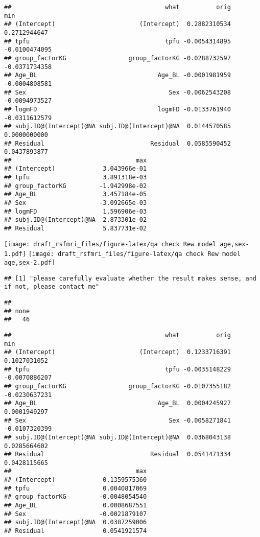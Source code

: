 \documentclass[
]{article}
\begin{document}
\begin{verbatim}
##                                          what          orig           min
## (Intercept)                       (Intercept)  0.2882310534  0.2712944647
## tpfu                                     tpfu -0.0054314895 -0.0100474095
## group_factorKG                 group_factorKG -0.0288732597 -0.0371734358
## Age_BL                                 Age_BL -0.0001981959 -0.0004808581
## Sex                                       Sex -0.0062543208 -0.0094973527
## logmFD                                 logmFD -0.0133761940 -0.0311612579
## subj.ID@(Intercept)@NA subj.ID@(Intercept)@NA  0.0144570585  0.0000000000
## Residual                             Residual  0.0585590452  0.0437893877
##                                  max
## (Intercept)             3.043966e-01
## tpfu                    3.891318e-03
## group_factorKG         -1.942998e-02
## Age_BL                  3.457184e-05
## Sex                    -3.092665e-03
## logmFD                  1.596906e-03
## subj.ID@(Intercept)@NA  2.873301e-02
## Residual                5.837731e-02
\end{verbatim}

\texttt{[image: draft\_rsfmri\_files/figure-latex/qa check Rew model age,sex-1.pdf]} \texttt{[image: draft\_rsfmri\_files/figure-latex/qa check Rew model age,sex-2.pdf]}

\begin{verbatim}
## [1] "please carefully evaluate whether the result makes sense, and if not, please contact me"
\end{verbatim}

\begin{verbatim}
## 
## none 
##   46
\end{verbatim}

\begin{verbatim}
##                                          what          orig           min
## (Intercept)                       (Intercept)  0.1233716391  0.1027031052
## tpfu                                     tpfu -0.0035148229 -0.0070886207
## group_factorKG                 group_factorKG -0.0107355182 -0.0230637231
## Age_BL                                 Age_BL  0.0004245927  0.0001949297
## Sex                                       Sex -0.0058271841 -0.0107320399
## subj.ID@(Intercept)@NA subj.ID@(Intercept)@NA  0.0368043138  0.0285664602
## Residual                             Residual  0.0541471334  0.0428115665
##                                  max
## (Intercept)             0.1359575360
## tpfu                    0.0040817069
## group_factorKG         -0.0048054540
## Age_BL                  0.0008687551
## Sex                    -0.0021879107
## subj.ID@(Intercept)@NA  0.0387259006
## Residual                0.0541921574
\end{verbatim}
\end{document}

